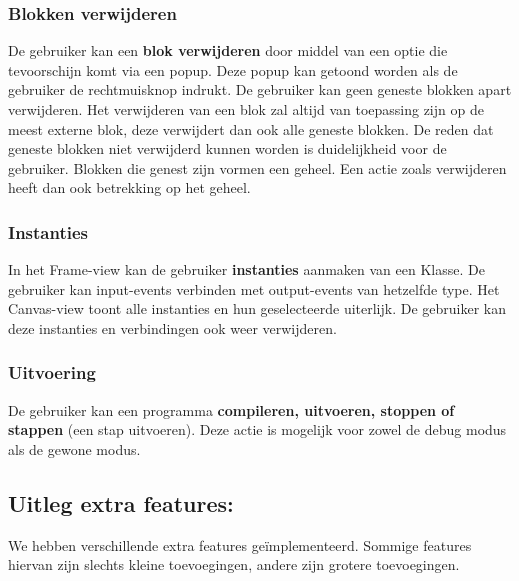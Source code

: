 \documentclass[]{article}
\begin{document}
\subsubsection{Blokken verwijderen}
De gebruiker kan een \textbf{blok verwijderen} door middel van een optie die tevoorschijn komt via een popup. Deze popup kan getoond worden als de gebruiker de rechtmuisknop indrukt. De gebruiker kan geen geneste blokken apart verwijderen. Het verwijderen van een blok zal altijd van toepassing zijn op de meest externe blok, deze verwijdert dan ook alle geneste blokken. De reden dat geneste blokken niet verwijderd kunnen worden is duidelijkheid voor de gebruiker. Blokken die genest zijn vormen een geheel. Een actie zoals verwijderen heeft dan ook betrekking op het geheel.

\subsubsection{Instanties}
In het Frame-view kan de gebruiker \textbf{instanties} aanmaken van een Klasse. De gebruiker kan input-events verbinden met output-events van hetzelfde type. Het Canvas-view toont alle instanties en hun geselecteerde uiterlijk. De gebruiker kan deze instanties en verbindingen ook weer verwijderen.

\subsubsection{Uitvoering}
De gebruiker kan een programma \textbf{compileren, uitvoeren, stoppen of stappen} (een stap uitvoeren). Deze actie is mogelijk voor zowel de debug modus als de gewone modus. 

\subsection{Uitleg extra features: }
We hebben verschillende extra features ge\"implementeerd. Sommige features hiervan zijn slechts kleine toevoegingen, andere zijn grotere toevoegingen. 
\label{extra}
\end{document}
